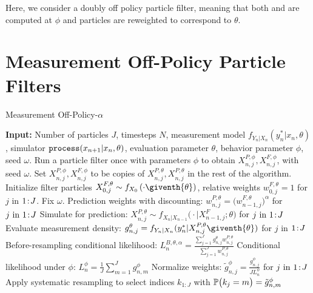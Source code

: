 \documentclass{article}
\begin{document}
Here, we consider a doubly off policy particle filter, meaning that both  and  are computed at $\phi$ and particles are reweighted to correspond to $\theta$.

\section{Measurement Off-Policy Particle Filters}

\begin{algorithm}[ht]
\centering
	\caption{Measurement Off-Policy-$\alpha$}
    \label{alg:mop}
	\begin{algorithmic}[1]
	     \STATE \textbf{Input:} Number of particles $J$, timesteps $N$, measurement model $f_{Y_n|X_n}(y_n^*|x_n, \theta)$, simulator $\texttt{process}(x_{n+1}|x_n, \theta)$, evaluation parameter $\theta$, behavior parameter $\phi$, seed $\omega$.
        \IF{$\theta \neq \phi$}
            \STATE Run a particle filter once with parameters $\phi$ to obtain $X_{n,j}^{P,\phi}, X_{n,j}^{F,\phi}$, with seed $\omega$.
        \ELSE
        \STATE Set $X_{n,j}^{P,\phi}, X_{n,j}^{F,\phi}$ to be copies of $X_{n,j}^{P,\theta}, X_{n,j}^{P,\theta}$ in the rest of the algorithm.
        \ENDIF
		\STATE Initialize filter particles ${X}_{0,j}^{F,\theta}\sim {f}_{{X}_{0}}\left(\cdot\giventh{\theta}\right)$, relative weights $w^{F,\theta}_{0,j}= 1$ for $j$ in ${1}\!:\!{J}$. Fix $\omega.$
            \STATE Prediction weights with discounting: $w_{n,j}^{P,\theta} = \big(w_{n-1,j}^{F,\theta}\big)^\alpha$ for $j\ \mathrm{in}\ {1}\!:\!{J}$
            \label{mop-alpha:discount}
            \STATE Simulate for prediction:
            ${X}_{n,j}^{P,\theta}\sim {f}_{{X}_{n}|{X}_{n-1}}\big(\cdot|{X}_{n-1,j}^{F};{\theta}\big)$ for $j\ \mathrm{in}\ {1}\!:\!{J}$ \label{mop-alpha:step1}
            \STATE Evaluate measurement density:
            $g^{\theta}_{n,j}={f}_{{Y}_{n}|{X}_{n}}(y_{n}^{*}|{X}_{n,j}^{P,\theta}\giventh{\theta})$ for $j$ in ${1}\!:\!{J}$
            \STATE Before-resampling conditional likelihood: $\displaystyle L_n^{B,\theta,\alpha} = \frac{\sum_{j=1}^Jg^\theta_{n,j} w^{P,\theta}_{n,j}}{\sum_{j=1}^J  w^{P,\theta}_{n,j}}$
            \STATE Conditional likelihood under $\phi$: 
            $L_n^{\phi} = \frac{1}{J}\sum_{m=1}^{J}g^{\phi}_{n,m}$
            \label{mop-alpha:Lphi}
            \STATE Normalize weights:
            $\displaystyle \tilde{g}^{\phi}_{n,j}= \frac{g^{\phi}_{n,j}}{JL_n^{\phi}}$
            for $j\ \mathrm{in}\ {1}\!:\!{J}$
            \STATE Apply systematic resampling to select indices $k_{1:J}$ with $\mathbb{P}\big(k_{j}=m\big) =\tilde{g}^{\phi}_{n,m}$ \label{mop-alpha:systematic}

\end{algorithmic}
\end{algorithm}
\end{document}
